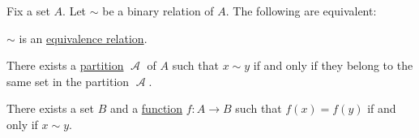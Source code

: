 \begin{proposition}\label{thm:equivalence_partition}
  Fix a set \( A \). Let \( {\sim} \) be a binary relation of \( A \). The following are equivalent:
  \begin{thmenum}
     \( {\sim} \) is an \hyperref[def:equivalence_relation]{equivalence relation}.

     There exists a \hyperref[def:set_partition]{partition} \( \mscrA \) of \( A \) such that \( x \sim y \) if and only if they belong to the same set in the partition \( \mscrA \).

     There exists a set \( B \) and a \hyperref[def:function]{function} \( f: A \to B \) such that \( f(x) = f(y) \) if and only if \( x \sim y \).
  \end{thmenum}
\end{proposition}
